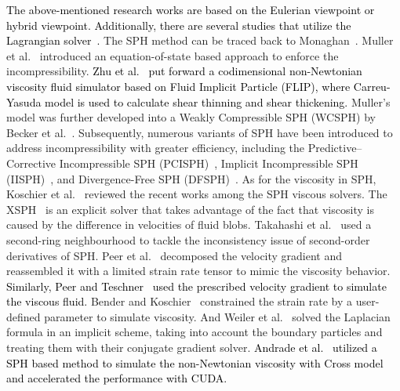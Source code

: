 \documentclass[10pt,journal,compsoc]{IEEEtran}
\newcommand{\revised}[1]{{\textcolor{black}{#1}}}
\begin{document}
\revised{The above-mentioned research works are based on the Eulerian viewpoint or hybrid viewpoint. Additionally, there are several studies that utilize the Lagrangian solver~\cite{Muller2004-elastic-plastic-melting,Solenthaler2007}.} The SPH method can be traced back to Monaghan~\cite{Monaghan1992}. Muller et al.~\cite{Muller03-SPH} introduced an equation-of-state based approach to enforce the incompressibility. \revised{Zhu et al.~\cite{Zhu2015-nonNewton} put forward a codimensional non-Newtonian viscosity fluid simulator based on Fluid Implicit Particle (FLIP), where Carreu-Yasuda model is used to calculate shear thinning and shear thickening.} Muller's model was further developed into a Weakly Compressible SPH (WCSPH) by Becker et al.~\cite{Becker2007-WCSPH}. Subsequently, numerous variants of SPH have been introduced to address incompressibility with greater efficiency, including the Predictive–Corrective Incompressible SPH (PCISPH)~\cite{Solenthaler2009-PCISPH}, Implicit Incompressible SPH (IISPH)~\cite{Ihmsen14-IISPH}, and Divergence-Free SPH (DFSPH)~\cite{Bender2017-DFSPH}. As for the viscosity in SPH, Koschier et al.~\cite{Koschier2019-Tut} reviewed the recent works among the SPH viscous solvers. The XSPH~\cite {Monaghan1992,Bridson2012-XSPH} is an explicit solver that takes advantage of the fact that viscosity is caused by the difference in velocities of fluid blobs. Takahashi et al.~\cite{Takahashi2015} used a second-ring neighbourhood to tackle the inconsistency issue of second-order derivatives of SPH. Peer et al.~\cite{Peer2015} decomposed the velocity gradient and reassembled it with a limited strain rate tensor to mimic the viscosity behavior. \revised{ Similarly, Peer and Teschner~\cite{Peer2017-Prescribed} used the prescribed velocity gradient to simulate the viscous fluid.}  Bender and Koschier~\cite{Bender2017-DFSPH} constrained the strain rate by a user-defined parameter to simulate viscosity. And Weiler et al.~\cite{Weiler2018-viscosity} solved the Laplacian formula in an implicit scheme, taking into account the boundary particles and treating them with their conjugate gradient solver.   \revised{Andrade et al.~\cite{Andrade2015} utilized a SPH based method to simulate the non-Newtonian viscosity with Cross model and accelerated the performance with CUDA.}
\end{document}
